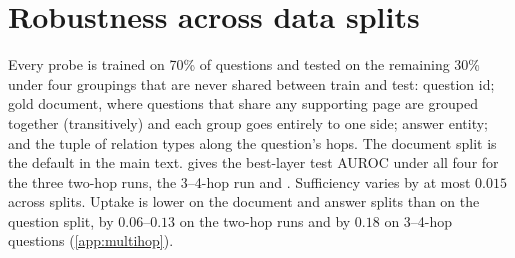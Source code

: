 \section{Robustness across data splits}
\label{app:splits}
Every probe is trained on 70\% of questions and tested on the remaining 30\% under four groupings that are never shared between train and test: question id; gold document, where questions that share any supporting page are grouped together (transitively) and each group goes entirely to one side; answer entity; and the tuple of relation types along the question's hops. The document split is the default in the main text.  gives the best-layer test AUROC under all four for the three two-hop runs, the 3--4-hop run and \twowiki{}. Sufficiency varies by at most $0.015$ across splits. Uptake is lower on the document and answer splits than on the question split, by $0.06$--$0.13$ on the two-hop runs and by $0.18$ on 3--4-hop questions (\cref{app:multihop}).
\begin{table}[t]
\centering\small

\caption{Best-layer AUROC under the four disjoint splits, for the three 2-hop runs, the 3--4-hop run and \twowiki{}.}
\label{tab:splits}
\end{table}
